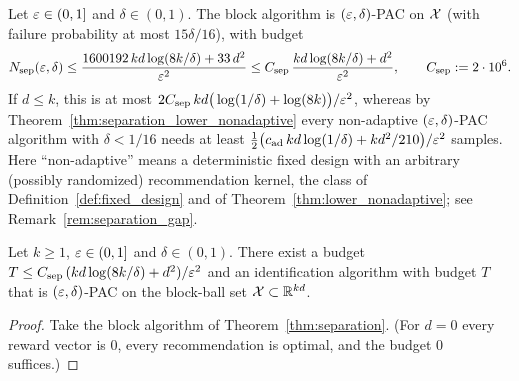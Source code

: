 \begin{theorem}\label{thm:separation}
\leanok
{}
Let $\varepsilon \in (0,1]$ and $\delta \in (0,1)$. The block algorithm is $(\varepsilon,\delta)$-PAC on $\mathcal{X}$
(with failure probability at most $15\delta/16$), with budget
\[
  N_{\mathrm{sep}}(\varepsilon,\delta)
  \le \frac{1600192\,kd\log(8k/\delta) + 33\,d^2}{\varepsilon^2}
  \le C_{\mathrm{sep}}\,\frac{kd\log(8k/\delta) + d^2}{\varepsilon^2},
  \qquad C_{\mathrm{sep}} := 2\cdot 10^6 .
\]
If $d \le k$, this is at most $2C_{\mathrm{sep}}\,kd\big(\log(1/\delta) + \log(8k)\big)/\varepsilon^2$,
whereas by Theorem~\ref{thm:separation_lower_nonadaptive} every non-adaptive
$(\varepsilon,\delta)$-PAC algorithm with $\delta < 1/16$ needs at least
$\tfrac12\big(c_{\mathrm{ad}}\,kd\log(1/\delta) + kd^2/210\big)/\varepsilon^2$ samples. Here
``non-adaptive'' means a deterministic fixed design with an arbitrary (possibly randomized)
recommendation kernel, the class of Definition~\ref{def:fixed_design} and of
Theorem~\ref{thm:lower_nonadaptive}; see Remark~\ref{rem:separation_gap}.
\end{theorem}

\begin{corollary}\label{cor:separation_exists}
\leanok
{}
Let $k \ge 1$, $\varepsilon \in (0,1]$ and $\delta \in (0,1)$. There exist a budget
$T \le C_{\mathrm{sep}}\,(kd\log(8k/\delta) + d^2)/\varepsilon^2$ and an identification algorithm with
budget $T$ that is $(\varepsilon,\delta)$-PAC on the block-ball set $\mathcal{X} \subset \mathbb{R}^{kd}$.
\end{corollary}
\begin{proof}
\leanok
{}
Take the block algorithm of Theorem~\ref{thm:separation}. (For $d = 0$ every reward vector is
$0$, every recommendation is optimal, and the budget $0$ suffices.)
\end{proof}

